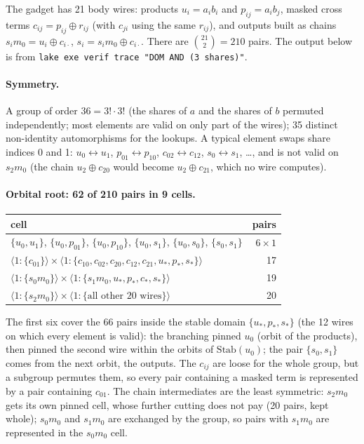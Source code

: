 \documentclass[11pt,a4paper]{article}
\theoremstyle{definition}
\theoremstyle{remark}
\newcommand{\code}[1]{\texttt{\small #1}}
\newcommand{\cellof}[2]{\langle #1 \mathbin{:} #2\rangle}
\newcommand{\Stab}{\mathrm{Stab}}
\begin{document}
The gadget has 21 body wires: products $u_i = a_ib_i$ and $p_{ij}=a_ib_j$, masked cross
terms $c_{ij} = p_{ij}\oplus r_{ij}$ (with $c_{ji}$ using the same $r_{ij}$), and outputs
built as chains $s_im_0 = u_i\oplus c_{i\cdot}$, $s_i = s_im_0\oplus c_{i\cdot}$.
There are $\binom{21}{2}=210$ pairs.  The output below is from
\code{lake exe verif trace "DOM AND (3 shares)"}.

\paragraph{Symmetry.}  A group of order $36 = 3!\cdot 3!$ (the
shares of $a$ and the shares of $b$ permuted independently; most elements are valid on only
part of the wires); 35 distinct non-identity automorphisms for the lookups.  A typical element swaps share indices 0 and 1:
$u_0\leftrightarrow u_1$, $p_{01}\leftrightarrow p_{10}$, $c_{02}\leftrightarrow c_{12}$,
$s_0\leftrightarrow s_1$, \dots, and is not valid on $s_2m_0$ (the chain
$u_2\oplus c_{20}$ would become $u_2\oplus c_{21}$, which no wire computes).

\paragraph{Orbital root: 62 of 210 pairs in 9 cells.}
\begin{center}\small
\begin{tabular}{@{}lr@{}}
\toprule
cell & pairs \\
\midrule
$\{u_0,u_1\}$, $\{u_0,p_{01}\}$, $\{u_0,p_{10}\}$, $\{u_0,s_1\}$, $\{u_0,s_0\}$, $\{s_0,s_1\}$ & $6\times 1$\\
$\cellof{1}{\{c_{01}\}}\times\cellof{1}{\{c_{10},c_{02},c_{20},c_{12},c_{21},u_\ast,p_\ast,s_\ast\}}$ & 17\\
$\cellof{1}{\{s_0m_0\}}\times\cellof{1}{\{s_1m_0,u_\ast,p_\ast,c_\ast,s_\ast\}}$ & 19\\
$\cellof{1}{\{s_2m_0\}}\times\cellof{1}{\{\text{all other 20 wires}\}}$ & 20\\
\bottomrule
\end{tabular}
\end{center}
The first six cover the 66 pairs inside the stable domain $\{u_\ast,p_\ast,s_\ast\}$ (the
12 wires on which every element is valid): the branching pinned $u_0$ (orbit of the
products), then pinned the second wire within the orbits of $\Stab(u_0)$; the pair
$\{s_0,s_1\}$ comes from the next orbit, the outputs.  The $c_{ij}$ are loose for the whole
group, but a subgroup permutes them, so every pair containing a masked term is represented by
a pair containing $c_{01}$.  The chain intermediates are the least symmetric: $s_2m_0$ gets
its own pinned cell, whose further cutting does not pay (20 pairs, kept whole); $s_0m_0$
and $s_1m_0$ are exchanged by the group, so pairs with $s_1m_0$ are represented in the
$s_0m_0$ cell.
\end{document}
